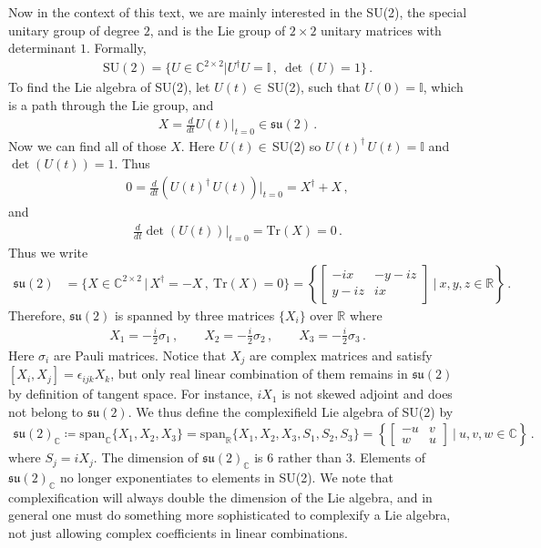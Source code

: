 \documentclass[11pt, onesided]{book}
\theoremstyle{break}
\theoremstyle{break}
\newcommand{\R}{\mathbb{R}}
\newcommand{\C}{\mathbb{C}}
\newcommand{\spa}{\text{span}}
\newcommand{\bmat}[1]{\begin{bmatrix} #1 \end{bmatrix}}
\begin{document}
Now in the context of this text, we are mainly interested in the SU(2), the special unitary group of degree $2$, and is the Lie group of $2\times 2$ unitary matrices with determinant $1$. Formally, 
\begin{align*}
\text{SU}(2) = \{ U \in \C^{2\times 2} | U^\dagger U = \mathbb{I}\,,\
\det(U) = 1\}\,.
\end{align*}
To find the Lie algebra of SU(2), let $U(t) \in\,$SU(2), such that $U(0) = \mathbb{I}$, which is a path through the Lie group, and 
\begin{align*}
X = \frac{d}{dt}U(t) |_{t=0} \in \mathfrak{su}(2)\,.
\end{align*}
Now we can find all of those $X$. Here $U(t) \in\,$SU(2) so $U(t)^\dagger\, U(t) = \mathbb{I}$ and $\det(U(t)) = 1$. Thus
\begin{align*}
0 = \frac{d}{dt}\left(U(t)^\dagger\, U(t)\right)|_{t=0} = X^\dagger + X\,,
\end{align*}
and 
\begin{align*}
\frac{d}{dt}\det(U(t))|_{t=0} = \text{Tr}(X) = 0\,.
\end{align*}
Thus we write
\begin{align*}
\mathfrak{su}(2) &= \{X\in \C^{2\times 2}\,|\, X^\dagger = -X \,,\ \text{Tr}(X) = 0\}= 
\left\{ \bmat{-ix & -y-iz \\ y-iz & ix} \ | \ x,y,z\in \R\right\}
\,.
\end{align*}
Therefore, $\mathfrak{su}(2)$ is spanned by three matrices $\{X_i\}$ over $\R$ where 
\begin{align*}
X_1 = -\frac{i}{2}\sigma_1\,,\qquad
X_2 = -\frac{i}{2}\sigma_2\,,\qquad
X_3 = -\frac{i}{2}\sigma_3\,.
\end{align*}
Here $\sigma_i$ are Pauli matrices. Notice that $X_j$ are complex matrices and satisfy $[X_i,X_j] = \epsilon_{ijk}X_k$, but only real linear combination of them remains in $\mathfrak{su}(2)$ by definition of tangent space. For instance, $iX_1$ is not skewed adjoint and does not belong to $\mathfrak{su}(2)$. We thus define the complexifield Lie algebra of SU(2) by
\begin{align*}
\mathfrak{su}(2)_\C \coloneqq \spa_\C\{X_1,X_2,X_3\}= \spa_\R\{X_1,X_2,X_3, S_1,S_2,S_3\}= \left\{\bmat{-u & v \\ w & u}\ | \ u,v,w\in \C\right\}\,.
\end{align*} 
where $S_j = iX_j$. The dimension of $\mathfrak{su}(2)_\C$ is $6$ rather than $3$. Elements of $\mathfrak{su}(2)_\C $ no longer exponentiates to elements in SU(2). We note that complexification will always double the dimension of the Lie algebra, and in general one must do something more sophisticated to complexify a Lie algebra, not just allowing complex coefficients in linear combinations.\\
\end{document}
